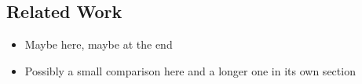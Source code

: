 \subsection{Related Work}
\begin{itemize}
  \item Maybe here, maybe at the end
  \item Possibly a small comparison here and a longer one in its own section
\end{itemize}